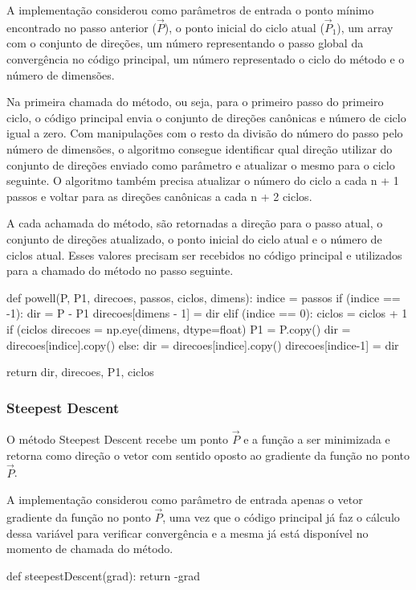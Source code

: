\documentclass[10pt, a4paper]{article}
\begin{document}
A implementação considerou como parâmetros de entrada o ponto mínimo encontrado no passo anterior ($\overrightarrow{P}$), o ponto inicial do 
ciclo atual ($\overrightarrow{P}_1$), um array com o conjunto de direções, um número representando o passo global da convergência
no código principal, um número representado o ciclo do método e o número de dimensões.

Na primeira chamada do método, ou seja, para o primeiro passo do primeiro ciclo, o código principal envia o conjunto de direções canônicas e número de ciclo igual a zero.
Com manipulações com o resto da divisão do número do passo pelo número de dimensões, o algoritmo consegue identificar qual direção utilizar do conjunto de direções
enviado como parâmetro e atualizar o mesmo para o ciclo seguinte. O algoritmo também precisa atualizar o número do ciclo a cada n + 1 passos e voltar para as direções
canônicas a cada n + 2 ciclos.  

A cada achamada do método, são retornadas a direção para o passo atual, o conjunto de direções atualizado, o ponto inicial do ciclo atual  e o número de ciclos atual.
Esses valores precisam ser recebidos no código principal e utilizados para a chamado do método no passo seguinte.

\begin{python}
  def powell(P, P1, direcoes, passos, ciclos, dimens):
    indice = passos%
    if (indice == -1):
        dir = P - P1
        direcoes[dimens - 1] = dir        
    elif (indice == 0):
        ciclos = ciclos + 1
        if (ciclos%
            direcoes = np.eye(dimens, dtype=float)
        P1 = P.copy()
        dir = direcoes[indice].copy()
    else:
        dir = direcoes[indice].copy()
        direcoes[indice-1] = dir
  
    return dir, direcoes, P1, ciclos 
\end{python}

\subsubsection{Steepest Descent}
O método Steepest Descent recebe um ponto $\overrightarrow{P}$ e a função a ser minimizada e retorna como direção o vetor com sentido oposto ao gradiente da função no ponto $\overrightarrow{P}$.

A implementação considerou como parâmetro de entrada apenas o vetor gradiente da função no ponto $\overrightarrow{P}$, uma vez que o código principal já faz o 
cálculo dessa variável para verificar convergência e a mesma já está disponível no momento de chamada do método.
\begin{python}
 def steepestDescent(grad):
    return -grad
\end{python}
\end{document}
